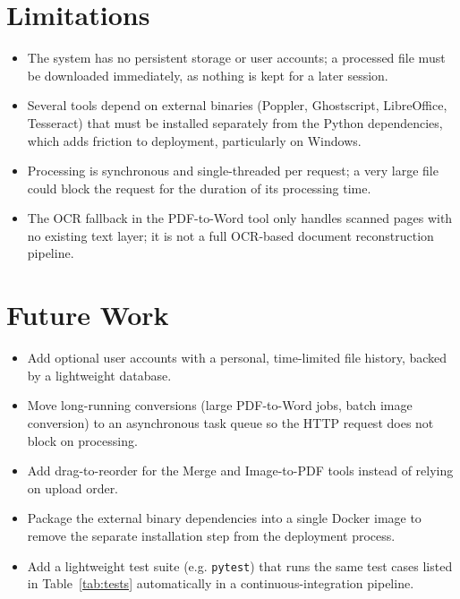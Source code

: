 \documentclass[12pt,a4paper]{report}
\begin{document}
\section{Limitations}
\begin{itemize}
  \item The system has no persistent storage or user accounts; a processed file must be
        downloaded immediately, as nothing is kept for a later session.
  \item Several tools depend on external binaries (Poppler, Ghostscript, LibreOffice, Tesseract)
        that must be installed separately from the Python dependencies, which adds friction to
        deployment, particularly on Windows.
  \item Processing is synchronous and single-threaded per request; a very large file could block
        the request for the duration of its processing time.
  \item The OCR fallback in the PDF-to-Word tool only handles scanned pages with no existing text
        layer; it is not a full OCR-based document reconstruction pipeline.
\end{itemize}

\section{Future Work}
\begin{itemize}
  \item Add optional user accounts with a personal, time-limited file history, backed by a
        lightweight database.
  \item Move long-running conversions (large PDF-to-Word jobs, batch image conversion) to an
        asynchronous task queue so the HTTP request does not block on processing.
  \item Add drag-to-reorder for the Merge and Image-to-PDF tools instead of relying on upload
        order.
  \item Package the external binary dependencies into a single Docker image to remove the
        separate installation step from the deployment process.
  \item Add a lightweight test suite (e.g. \texttt{pytest}) that runs the same test cases listed
        in Table~\ref{tab:tests} automatically in a continuous-integration pipeline.
\end{itemize}
\end{document}
